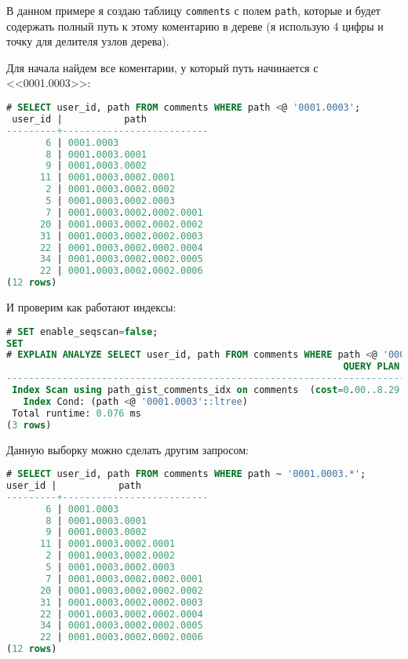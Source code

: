 В данном примере я создаю таблицу \lstinline!comments! с полем \lstinline!path!, которые и будет содержать полный путь к этому коментарию в дереве (я использую 4 цифры и точку для делителя узлов дерева).

Для начала найдем все коментарии, у который путь начинается с <<0001.0003>>:

\begin{lstlisting}[language=SQL,label=lst:pgltree4,caption=Ltree]
# SELECT user_id, path FROM comments WHERE path <@ '0001.0003';
 user_id |           path
---------+--------------------------
       6 | 0001.0003
       8 | 0001.0003.0001
       9 | 0001.0003.0002
      11 | 0001.0003.0002.0001
       2 | 0001.0003.0002.0002
       5 | 0001.0003.0002.0003
       7 | 0001.0003.0002.0002.0001
      20 | 0001.0003.0002.0002.0002
      31 | 0001.0003.0002.0002.0003
      22 | 0001.0003.0002.0002.0004
      34 | 0001.0003.0002.0002.0005
      22 | 0001.0003.0002.0002.0006
(12 rows)
\end{lstlisting}

И проверим как работают индексы:

\begin{lstlisting}[language=SQL,label=lst:pgltree5,caption=Ltree]
# SET enable_seqscan=false;
SET
# EXPLAIN ANALYZE SELECT user_id, path FROM comments WHERE path <@ '0001.0003';
                                                            QUERY PLAN
-----------------------------------------------------------------------------------------------------------------------------------
 Index Scan using path_gist_comments_idx on comments  (cost=0.00..8.29 rows=2 width=38) (actual time=0.023..0.034 rows=12 loops=1)
   Index Cond: (path <@ '0001.0003'::ltree)
 Total runtime: 0.076 ms
(3 rows)
\end{lstlisting}

Данную выборку можно сделать другим запросом:

\begin{lstlisting}[language=SQL,label=lst:pgltree6,caption=Ltree]
# SELECT user_id, path FROM comments WHERE path ~ '0001.0003.*';
user_id |           path
---------+--------------------------
       6 | 0001.0003
       8 | 0001.0003.0001
       9 | 0001.0003.0002
      11 | 0001.0003.0002.0001
       2 | 0001.0003.0002.0002
       5 | 0001.0003.0002.0003
       7 | 0001.0003.0002.0002.0001
      20 | 0001.0003.0002.0002.0002
      31 | 0001.0003.0002.0002.0003
      22 | 0001.0003.0002.0002.0004
      34 | 0001.0003.0002.0002.0005
      22 | 0001.0003.0002.0002.0006
(12 rows)
\end{lstlisting}

